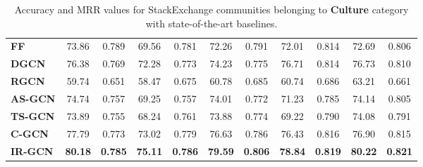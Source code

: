 \documentclass[smallcondensed]{svjour3}     %
\begin{document}
\begin{table}[h]
\begin{tabular}{l|c c|c c|c c|c c|c c}
        \textbf{FF~\cite{JendersKN16}}&73.86&0.789&69.56&0.781&72.26&0.791&72.01&0.814&72.69&0.806\\

        \textbf{DGCN~\cite{DualGCN}}&76.38&0.769&72.28&0.773&74.23&0.775&76.71&0.814&76.73&0.810\\

        \textbf{RGCN~\cite{relationalGCN}}&59.74&0.651&58.47&0.675&60.78&0.685&60.74&0.686&63.21&0.661\\
        \cmidrule(lr){1-1}\cmidrule(lr){2-11}
        \textbf{AS-GCN}&74.74&0.757&69.25&0.757&74.01&0.772&71.23&0.785&74.14&0.805\\

        \textbf{TS-GCN}&73.89&0.755&68.24&0.761&73.88&0.774&69.22&0.790&74.08&0.791\\

        \textbf{C-GCN}&77.79&0.773&73.02&0.779&76.63&0.786&76.43&0.816&76.90&0.815\\

        \textbf{IR-GCN}&\textbf{80.18}&\textbf{0.785}&\textbf{75.11}&\textbf{0.786}&\textbf{79.59}&\textbf{0.806}&\textbf{78.84}&\textbf{0.819}&\textbf{80.22}&\textbf{0.821}\\
      \bottomrule
    \end{tabular}
  \caption{\label{tab:stackacc2} Accuracy and MRR values for StackExchange communities belonging to \textbf{Culture} category with state-of-the-art baselines.}
\end{table}
\end{document}
